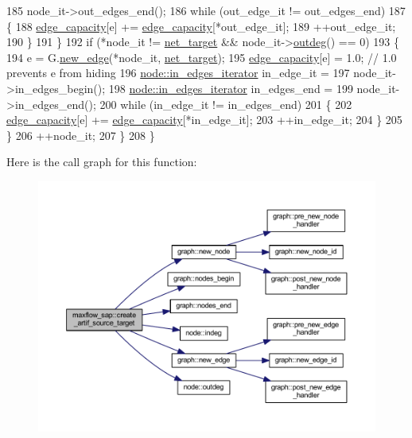 \begin{DoxyCode}
185                 node\_it->out\_edges\_end();
186             \textcolor{keywordflow}{while} (out\_edge\_it != out\_edges\_end)
187             \{
188                 \mbox{\hyperlink{classmaxflow__sap_acfa95eef5ea5bf7814c4dabd3994bc63}{edge\_capacity}}[e] += \mbox{\hyperlink{classmaxflow__sap_acfa95eef5ea5bf7814c4dabd3994bc63}{edge\_capacity}}[*out\_edge\_it];
189                 ++out\_edge\_it;
190             \}
191         \}
192         \textcolor{keywordflow}{if} (*node\_it != \mbox{\hyperlink{classmaxflow__sap_a8d0e8f448ed29a1329a70c8f4f496c2c}{net\_target}} && node\_it->\mbox{\hyperlink{classnode_a32adc45c4132e2642ccd2233d79ffe67}{outdeg}}() == 0)
193         \{
194             e = G.\mbox{\hyperlink{classgraph_a02a0c3a219f75d68caa408ef339d4a1c}{new\_edge}}(*node\_it, \mbox{\hyperlink{classmaxflow__sap_a8d0e8f448ed29a1329a70c8f4f496c2c}{net\_target}});
195             \mbox{\hyperlink{classmaxflow__sap_acfa95eef5ea5bf7814c4dabd3994bc63}{edge\_capacity}}[e] = 1.0;    \textcolor{comment}{// 1.0 prevents e from hiding}
196             \mbox{\hyperlink{classnode_a9a96be92add7c1a2771bcd0431ebf8ab}{node::in\_edges\_iterator}} in\_edge\_it =
197                 node\_it->in\_edges\_begin();
198             \mbox{\hyperlink{classnode_a9a96be92add7c1a2771bcd0431ebf8ab}{node::in\_edges\_iterator}} in\_edges\_end =
199                 node\_it->in\_edges\_end();
200             \textcolor{keywordflow}{while} (in\_edge\_it != in\_edges\_end)
201             \{
202                 \mbox{\hyperlink{classmaxflow__sap_acfa95eef5ea5bf7814c4dabd3994bc63}{edge\_capacity}}[e] += \mbox{\hyperlink{classmaxflow__sap_acfa95eef5ea5bf7814c4dabd3994bc63}{edge\_capacity}}[*in\_edge\_it];
203                 ++in\_edge\_it;
204             \}
205         \}
206         ++node\_it;
207     \}
208 \}
\end{DoxyCode}
Here is the call graph for this function\+:\nopagebreak
\begin{figure}[H]
\begin{center}
\leavevmode
\includegraphics[width=350pt]{classmaxflow__sap_a617016b94a4924fb2574ab87c970d49c_cgraph}
\end{center}
\end{figure}
